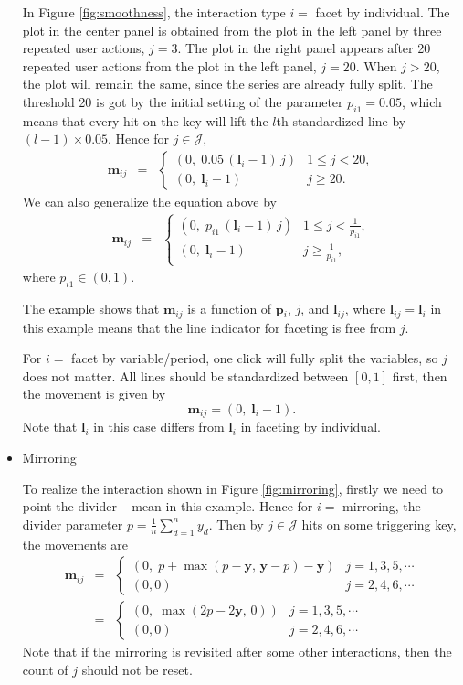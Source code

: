 \documentclass[12pt]{article}
\begin{document}
\begin{itemize}
In Figure \ref{fig:smoothness}, the interaction type
$i=$ facet by individual. The plot in the center
panel is obtained from the plot in the left panel by
three repeated user actions, $j=3$. The plot in the 
right panel appears after 20 repeated user actions from
the plot in the left panel, $j=20$. When $j>20$, the
plot will remain the same, since the series are already
fully split. The threshold 20 is got by the initial
setting of the parameter $p_{i1}=0.05$, which means that every hit
on the key will lift the $l$th standardized line by $(l-1)\times0.05$.
Hence for $j\in\mathcal{J}$,
\begin{eqnarray*}
\mathbf{m}{}_{ij} & = & \begin{cases}
 (0,\;0.05\, (\mathbf{l}{}_i-1)\, j) & 1\leq j<20,\\
 (0,\; \mathbf{l}{}_i-1) & j\ge20.
\end{cases}
\end{eqnarray*}
We can also generalize the equation above by
\begin{eqnarray*}
\mathbf{m}{}_{ij} & = & \begin{cases}
 (0,\; p_{i1}\, (\mathbf{l}{}_i-1)\, j) & 1\leq j<\frac{1}{p_{i1}},\\
 (0,\; \mathbf{l}{}_i-1) & j\ge\frac{1}{p_{i1}},
\end{cases}
\end{eqnarray*}
where $p_{i1}\in (0,1)$.

The example shows that $\mathbf{m}{}_{ij}$ is a function of $\mathbf{p}{}_{i}$,
$j$, and $\mathbf{l}_{ij}$, where $\mathbf{l}_{ij}=\mathbf{l}{}_i$ in this example
means that the line indicator for faceting is free from $j$.

For $i=$ facet by variable/period, one click will fully split
the variables, so $j$ does not matter. All lines should be 
standardized between $[0,1]$ first, then the movement is given by
\[
\mathbf{m}{}_{ij} = (0,\; \mathbf{l}{}_i-1).
\]
Note that $\mathbf{l}{}_i$ in this case differs from
$\mathbf{l}{}_i$ in faceting by individual.

\item Mirroring

To realize the interaction shown in Figure \ref{fig:mirroring},
firstly we need to point the divider -- mean in this example.
Hence for $i=$ mirroring, the divider parameter
$p = \frac{1}{n}\sum_{d=1}^{n}y_d$. Then by $j\in\mathcal{J}$
hits on some triggering key, the movements are
\begin{eqnarray*}
\mathbf{m}{}_{ij} & = & \begin{cases}
(0, \; p+\max(p-\mathbf{y},\,\mathbf{y}-p)-\mathbf{y}) & j=1,3,5,\cdots \\
(0,0) & j=2,4,6,\cdots
\end{cases}\\ & = & \begin{cases}
(0, \; \max(2p-2\mathbf{y},\,0)) & j=1,3,5,\cdots \\
(0,0) & j=2,4,6,\cdots
\end{cases}
\end{eqnarray*}
Note that if the mirroring is revisited after some other interactions,
then the count of $j$ should not be reset.


\end{itemize}
\end{document}
